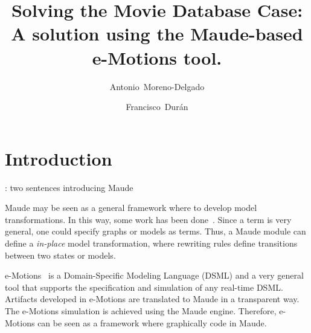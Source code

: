 \documentclass[draft]{llncs}
\newcommand{\todo}[1]{\textbf{\color{red}{TO-DO}}: #1}
\newcommand{\todo}[1]{}
\begin{document}
\pagestyle{headings} %

\title{Solving the Movie Database Case: A solution using the Maude-based e-Motions tool.}

\author{Antonio~Moreno-Delgado \and Francisco~Dur\'an}



\maketitle

\begin{abstract}

\end{abstract}

\section{Introduction}\label{sec:intro}

\todo{two sentences introducing Maude}

Maude may be seen as a general framework where to develop model transformations. In this way, some work has been done~\cite{troyaATL}. Since a term is very general, one could specify graphs or models as terms. Thus, a Maude module can define a \textit{in-place} model transformation, where rewriting rules define transitions between two states or models.

e-Motions~\cite{emotions} is a Domain-Specific Modeling Language (DSML) and a very general tool that supports the specification and simulation of any real-time DSML. Artifacts developed in e-Motions are translated to Maude in a transparent way. The e-Motions simulation is achieved using the Maude engine. Therefore, e-Motions can be seen as a framework where graphically code in Maude.
\end{document}

